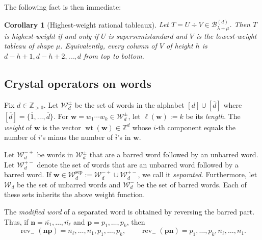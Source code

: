 \documentclass[12pt]{amsart}
\newcommand{\bs}{\boldsymbol}
\newtheorem{corollary}[theorem]{Corollary}
\theoremstyle{definition}
\theoremstyle{remark}
\newcommand{\barindex}[1]{\overline{#1}}
\begin{document}
The following fact is then immediate:
\begin{corollary}[Highest-weight rational tableaux]\label{cor:superlowertab}
Let $T=U\div V\in\mathcal B_{\lambda\div\mu}^{(d)}$.
Then $T$ is highest-weight if and only if $U$ is
supersemistandard and $V$ is the lowest-weight tableau of shape
$\mu$. Equivalently, every column of $V$ of height $h$ is
$d-h+1,d-h+2,\ldots,d$ from top to bottom.
\end{corollary}

\subsection{Crystal operators on words}\label{subsec:CryStembridge}
Fix $d\in {\mathbb Z}_{>0}$. Let ${\mathcal W}_d^{\pm}$ be the set of words in the alphabet
$[d]\cup [\barindex d]$ where $[\barindex d]=\{\barindex{1},\ldots,\barindex{d}\}$. 
For ${\bs w}=w_1\cdots w_k\in {\mathcal W}_d^{\pm}$, let $\ell({\bs w}) := k$ be its \emph{length}. The \emph{weight} of ${\bs w}$ is the vector $\operatorname{wt}({\bs w})\in{\mathbb Z}^d$ whose $i$-th component equals the number of $i$'s minus the number of $\barindex{i}$'s in ${\bs w}$.

Let ${\mathcal W}_{d}^{-+}$ be words in ${\mathcal W}_d^{\pm}$ that are a barred word followed by an
unbarred word. Let ${\mathcal W}_d^{+-}$ denote the set of words that are an unbarred word followed
by a barred word. If $\bs{w}\in {\mathcal W}_{d}^{\operatorname{sep}}:= {\mathcal W}_d^{-+}\cup {\mathcal W}_d^{+-}$,
we call it \emph{separated}. Furthermore, let ${\mathcal W}_{d}$ be the set of unbarred words and ${\mathcal W}_{d}^-$ be the set of barred words.
Each of these sets inherits the above weight function.

The \emph{modified word} of a separated word is obtained by reversing the barred part. Thus, if ${\bs n}= \barindex{n_1},\ldots, \barindex{n_\ell}$ and ${\bs p}=p_1,\ldots, p_k$, then 
\[\operatorname{rev}_{-}({\bs n}{\bs p}) = \barindex{n_\ell},\ldots, \barindex{n_1},p_1,\ldots, p_k, \qquad 
\operatorname{rev}_{-}({\bs p}{\bs n}) = p_1,\ldots, p_k,\barindex{n_\ell},\ldots, \barindex{n_1}.\] 
\end{document}
